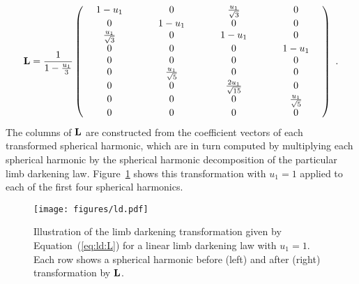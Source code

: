 \documentclass[modern]{aastex631}
\begin{document}
\begin{align}
    \label{eq:ld:L}
    \bvec{L} =
    \frac{1}{1 - \frac{u_1}{3}}
    \begin{pmatrix}
        \quadquad1-u_1\quadquad & 0                       & \frac{u_1}{\sqrt{3}}    & 0                       \\
        0                       & \quadquad1-u_1\quadquad & 0                       & 0                       \\
        \frac{u_1}{\sqrt{3}}    & 0                       & \quadquad1-u_1\quadquad & 0                       \\
        0                       & 0                       & 0                       & \quadquad1-u_1\quadquad \\
        0                       & 0                       & 0                       & 0                       \\
        0                       & \frac{u_1}{\sqrt{5}}    & 0                       & 0                       \\
        0                       & 0                       & \frac{2u_1}{\sqrt{15}}  & 0                       \\
        0                       & 0                       & 0                       & \frac{u_1}{\sqrt{5}}    \\
        0                       & 0                       & 0                       & 0
    \end{pmatrix}
    \quad.
\end{align}
%
The columns of ${\mathbf{L}}$ are constructed from the coefficient vectors of each transformed spherical harmonic, which are in turn computed by multiplying each spherical harmonic by the spherical harmonic decomposition of the particular limb darkening law.
Figure~\ref{fig:ld} shows this transformation with $u_1 = 1$ applied to each of the first four spherical harmonics.
%
\begin{figure}[t!]
    \begin{centering}
        \texttt{[image: figures/ld.pdf]}
        \caption{%
            Illustration of the limb darkening transformation given by Equation~(\ref{eq:ld:L}) for a linear limb darkening law with $u_1 = 1$. 
            Each row shows a spherical harmonic before (left) and after (right) transformation by ${\mathbf{L}}$.
        }
        \label{fig:ld}
    \end{centering}
\end{figure}
%
\end{document}
